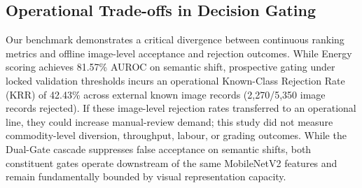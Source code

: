 \subsection{Operational Trade-offs in Decision Gating}
Our benchmark demonstrates a critical divergence between continuous ranking metrics and offline image-level acceptance and rejection outcomes. While Energy scoring achieves 81.57\% AUROC on semantic shift, prospective gating under locked validation thresholds incurs an operational Known-Class Rejection Rate (KRR) of 42.43\% across external known image records (2,270/5,350 image records rejected). If these image-level rejection rates transferred to an operational line, they could increase manual-review demand; this study did not measure commodity-level diversion, throughput, labour, or grading outcomes. While the Dual-Gate cascade suppresses false acceptance on semantic shifts, both constituent gates operate downstream of the same MobileNetV2 features and remain fundamentally bounded by visual representation capacity.

